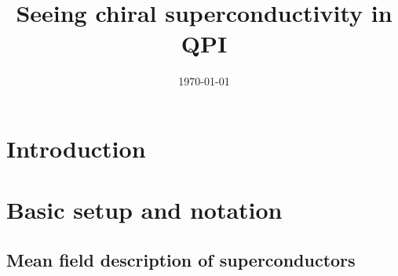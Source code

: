 \documentclass[aps,prb,twocolumn,superscriptaddress,nofootinbib]{revtex4-2}
\begin{document}
\title{Seeing chiral superconductivity in QPI}


\date{\today}

\begin{abstract}
\end{abstract}

\maketitle

\section{Introduction}

\section{Basic setup and notation}

\subsection{Mean field description of superconductors}
\end{document}
